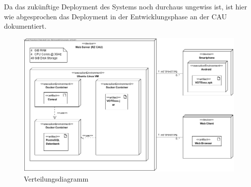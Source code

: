Da das zukünftige Deployment des Systems noch durchaus ungewiss ist, ist hier wie abgesprochen das Deployment in der Entwicklungsphase an der CAU dokumentiert.

\begin{figure}[h]
	\centering
	\includegraphics[width=\textwidth]{img/deployment.png}	
	\caption{Verteilungsdiagramm}
	\label{fig:verteilungsdiagramm}
\end{figure}